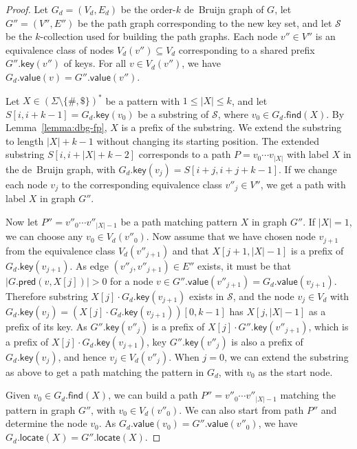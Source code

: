 \documentclass[a4paper,UKenglish]{lipics-v2016}
\newcommand{\set}[1]{\ensuremath{\{ #1 \}}}
\newcommand{\abs}[1]{\ensuremath{\lvert #1 \rvert}}
\newcommand{\find}{\ensuremath{\mathsf{find}}}
\newcommand{\locate}{\ensuremath{\mathsf{locate}}}
\newcommand{\gpred}{\ensuremath{\mathsf{pred}}}
\newcommand{\gkey}{\ensuremath{\mathsf{key}}}
\newcommand{\gvalue}{\ensuremath{\mathsf{value}}}
\newcommand{\kcollection}[1]{$#1$\nobreakdash-collection}
\newcommand{\orderk}[1]{order\nobreakdash-$#1$}
\begin{document}
\begin{proof}
Let $G_{d} = (V_{d}, E_{d})$ be the \orderk{k} de~Bruijn graph of $G$, let $G'' = (V'', E'')$ be the path graph corresponding to the new key set, and let $\mathcal{S}$ be the \kcollection{k} used for building the path graphs. Each node $v'' \in V''$ is an equivalence class of nodes $V_{d}(v'') \subseteq V_{d}$ corresponding to a shared prefix $G''.\gkey(v'')$ of keys. For all $v \in V_{d}(v'')$, we have $G_{d}.\gvalue(v) = G''.\gvalue(v'')$.

Let $X \in (\Sigma \setminus \set{\#, \$})^{\ast}$ be a pattern with $1 \le \abs{X} \le k$, and let $S[i, i+k-1] = G_{d}.\gkey(v_{0})$ be a substring of $\mathcal{S}$, where $v_{0} \in G_{d}.\find(X)$. By Lemma~\ref{lemma:dbg-fp}, $X$ is a prefix of the substring. We extend the substring to length $\abs{X}+k-1$ without changing its starting position. The extended substring $S[i, i+\abs{X}+k-2]$ corresponds to a path $P = v_{0} \dotsm v_{\abs{X}}$ with label $X$ in the de~Bruijn graph, with $G_{d}.\gkey(v_{j}) = S[i+j, i+j+k-1]$. If we change each node $v_{j}$ to the corresponding equivalence class $v''_{j} \in V''$, we get a path with label $X$ in graph $G''$.

Now let $P'' = v''_{0} \dotsm v''_{\abs{X}-1}$ be a path matching pattern $X$ in graph $G''$. If $\abs{X} = 1$, we can choose any $v_{0} \in V_{d}(v''_{0})$. Now assume that we have chosen node $v_{j+1}$ from the equivalence class $V_{d}(v''_{j+1})$ and that $X[j+1, \abs{X}-1]$ is a prefix of $G_{d}.\gkey(v_{j+1})$. As edge $(v''_{j}, v''_{j+1}) \in E''$ exists, it must be that $\abs{G.\gpred(v, X[j])} > 0$ for a node $v \in G''.\gvalue(v''_{j+1}) = G_{d}.\gvalue(v_{j+1})$. Therefore substring $X[j] \cdot G_{d}.\gkey(v_{j+1})$ exists in $\mathcal{S}$, and the node $v_{j} \in V_{d}$ with $G_{d}.\gkey(v_{j}) = (X[j] \cdot G_{d}.\gkey(v_{j+1}))[0, k-1]$ has $X[j, \abs{X}-1]$ as a prefix of its key. As $G''.\gkey(v''_{j})$ is a prefix of $X[j] \cdot G''.\gkey(v''_{j+1})$, which is a prefix of $X[j] \cdot G_{d}.\gkey(v_{j+1})$, key $G''.\gkey(v''_{j})$ is also a prefix of $G_{d}.\gkey(v_{j})$, and hence $v_{j} \in V_{d}(v''_{j})$. When $j = 0$, we can extend the substring as above to get a path matching the pattern in $G_{d}$, with $v_{0}$ as the start node.

Given $v_{0} \in G_{d}.\find(X)$, we can build a path $P'' = v''_{0} \dotsm v''_{\abs{X}-1}$ matching the pattern in graph $G''$, with $v_{0} \in V_{d}(v''_{0})$. We can also start from path $P''$ and determine the node $v_{0}$. As $G_{d}.\gvalue(v_{0}) = G''.\gvalue(v''_{0})$, we have $G_{d}.\locate(X) = G''.\locate(X)$.
\end{proof}
\end{document}

